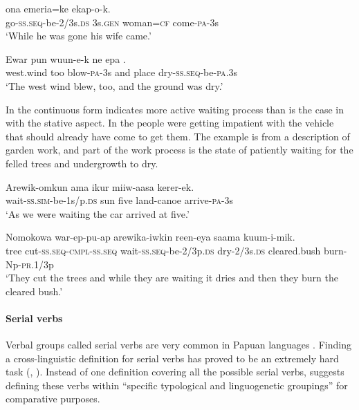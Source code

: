 \ea%
\label{ex:3:x358}
\gll {} ona emeria=ke ekap-o-k. \\
go-\textsc{ss}.\textsc{seq}-be-2/3s.\textsc{ds} 3s.\textsc{gen} woman=\textsc{cf} come-\textsc{pa}-3s\\
\glt`While he was gone his wife came.'
\z

\ea%
\label{ex:3:x1047}
\gll Ewar pun wuun-e-k ne epa . \\
west.wind too blow-\textsc{pa}-3s and place dry-\textsc{ss}.\textsc{seq}-be-\textsc{pa}.3s\\
\glt`The west wind blew, too, and the ground was dry.'
\z

In  the continuous form indicates more active waiting process than is the case in  with the stative aspect. In  the people were getting impatient with the vehicle that should already have come to get them. The example  is from a description of garden work, and part of the work process is the state of patiently waiting for the felled trees and undergrowth to dry. 

\ea%
\label{ex:3:x359}
\gll Arewik-omkun ama ikur miiw-aasa kerer-ek. \\
wait-\textsc{ss}.\textsc{sim}-be-1s/p.\textsc{ds} sun five land-canoe arrive-\textsc{pa}-3s\\
\glt`As we were waiting the car arrived at five.'
\z

\ea%
\label{ex:3:x360}
\gll Nomokowa war-ep-pu-ap arewika-iwkin reen-eya saama kuum-i-mik.\\
tree cut-\textsc{ss}.\textsc{seq}-\textsc{cmpl}-\textsc{ss}.\textsc{seq} wait-\textsc{ss}.\textsc{seq}-be-2/3p.\textsc{ds} dry-2/3s.\textsc{ds} cleared.bush burn-Np-\textsc{pr}.1/3p\\
\glt`They cut the trees and while they are waiting it dries and then they burn the cleared bush.' 
\z

\paragraph{Serial verbs} \label{sec:3.8.5.1.2}
{}
Verbal groups called serial verbs are very common in Papuan languages \citep[116]{Foley1986}. Finding a cross-linguistic definition for serial verbs has proved to be an extremely hard task (\citealt[5]{Sebba1987}, \citealt[1]{Lord1993}). Instead of one definition covering all the possible serial verbs, \citet[19]{Crowley2002} suggests defining these verbs within ``{specific typological and linguogenetic groupings}'' for comparative purposes. 

